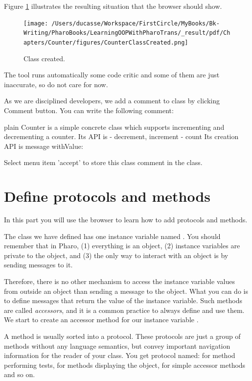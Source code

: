 \documentclass[10pt,twoside,english]{_support/latex/sbabook/sbabook}
\begin{document}
Figure \ref{figclassCreated} illustrates the resulting situation that the browser should show.

\begin{figure}

\begin{center}
\texttt{[image: /Users/ducasse/Workspace/FirstCircle/MyBooks/Bk-Writing/PharoBooks/LearningOOPWithPharoTrans/\_result/pdf/Chapters/Counter/figures/CounterClassCreated.png]}\caption{Class created.\label{figclassCreated}}\end{center}
\end{figure}


The tool runs automatically some code critic and some of them are just inaccurate, so do not care for now. 

As we are disciplined developers, we add a comment to  class by clicking Comment button. You can write the following comment:

\begin{displaycode}{plain}
Counter is a simple concrete class which supports incrementing and decrementing a counter.
Its API is 
- decrement, increment
- count
Its creation API is message withValue: 
\end{displaycode}

Select menu item 'accept' to store this class comment in the class.
\section{Define protocols and methods}
In this part you will use the browser to learn how to add protocols and methods.

The class we have defined has one instance variable named . You should remember that in Pharo, (1) everything is an object, (2)  instance variables are private to the object, and (3) the only way to interact with an object is by sending messages to it.

Therefore, there is no other mechanism to access the instance variable values from outside an object than sending a message to the object. What you can do is to define messages that return the value of the instance variable. Such methods are called \textit{accessors}, and it is a common practice to always define and use them. We start to create an accessor method for our instance variable .

A method is usually sorted into a protocol. These protocols are just a group of methods without any language semantics, but convey important navigation information for the reader of your class. You get protocol named:  for method performing tests,  for methods displaying the object,  for simple accessor methods and so on. 
\end{document}
